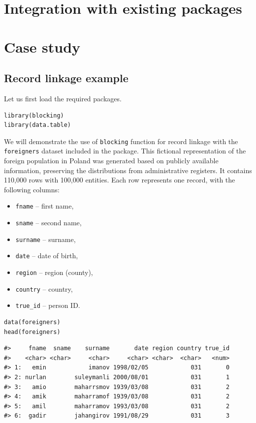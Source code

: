 \section{Integration with existing packages}\label{integration-with-existing-packages}

\section{Case study}\label{case-study}

\subsection{Record linkage example}\label{record-linkage-example}

Let us first load the required packages.

\begin{verbatim}
library(blocking)
library(data.table)
\end{verbatim}

We will demonstrate the use of \texttt{blocking} function for record linkage with the \texttt{foreigners} dataset included in the package. This fictional representation of the foreign population in Poland was generated based on publicly available information, preserving the distributions from administrative registers. It contains 110,000 rows with 100,000 entities. Each row represents one record, with the following columns:

\begin{itemize}
\tightlist
\item
  \texttt{fname} -- first name,
\item
  \texttt{sname} -- second name,
\item
  \texttt{surname} -- surname,
\item
  \texttt{date} -- date of birth,
\item
  \texttt{region} -- region (county),
\item
  \texttt{country} -- country,
\item
  \texttt{true\_id} -- person ID.
\end{itemize}

\begin{verbatim}
data(foreigners)
head(foreigners)
\end{verbatim}

\begin{verbatim}
#>     fname  sname    surname       date region country true_id
#>    <char> <char>     <char>     <char> <char>  <char>   <num>
#> 1:   emin            imanov 1998/02/05            031       0
#> 2: nurlan        suleymanli 2000/08/01            031       1
#> 3:   amio        maharrsmov 1939/03/08            031       2
#> 4:   amik        maharramof 1939/03/08            031       2
#> 5:   amil        maharramov 1993/03/08            031       2
#> 6:  gadir        jahangirov 1991/08/29            031       3
\end{verbatim}

